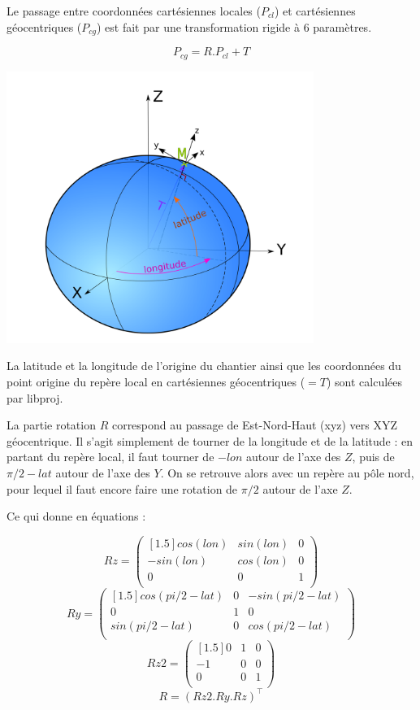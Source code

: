 \documentclass[french]{report}
\begin{document}
Le passage entre coordonnées cartésiennes locales ($P_{cl}$) et cartésiennes géocentriques ($P_{cg}$) est fait par une transformation rigide à 6 paramètres.

$$P_{cg} = R . P_{cl}  + T$$

\begin{center}
\includegraphics[width = 10cm]{images/cart_geocentr}
\end{center}

La latitude et la longitude de l'origine du chantier ainsi que les coordonnées du point origine du repère local en cartésiennes géocentriques ($=T$) sont calculées par libproj.

La partie rotation $R$ correspond au passage de Est-Nord-Haut (xyz) vers XYZ géocentrique. Il s'agit simplement de tourner de la longitude et de la latitude :
en partant du repère local, il faut tourner de $-lon$ autour de l'axe des $Z$, puis de $\pi/2-lat$ autour de l'axe des $Y$.
On se retrouve alors avec un repère au pôle nord, pour lequel il faut encore faire une rotation de $\pi/2$ autour de l'axe $Z$.

Ce qui donne en équations :

$$Rz=\begin{pmatrix}[1.5]  cos(lon) & sin(lon)&  0 \\ -sin(lon) & cos(lon) & 0 \\  0 &  0 & 1 \\ \end{pmatrix}$$
$$Ry=\begin{pmatrix}[1.5] cos(pi/2-lat) & 0 & -sin(pi/2-lat) \\  0 & 1 & 0 \\ sin(pi/2-lat) & 0 & cos(pi/2-lat) \\ \end{pmatrix}$$
$$Rz2=\begin{pmatrix}[1.5] 0 & 1 & 0 \\ -1 & 0 & 0 \\ 0 & 0 & 1 \\ \end{pmatrix}$$
$$R=(Rz2.Ry.Rz)^\top$$
\end{document}

